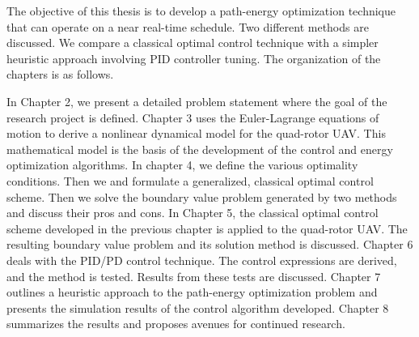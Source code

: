 The objective of this thesis is to develop a path-energy optimization technique that can operate on a near real-time schedule. Two different methods are discussed. We compare a classical optimal control technique with a simpler heuristic approach involving PID controller tuning. The organization of the chapters is as follows.

In Chapter 2, we present a detailed problem statement where the goal of the research project is defined. Chapter 3 uses the Euler-Lagrange equations of motion to derive a nonlinear dynamical model for the quad-rotor UAV. This mathematical model is the basis of the development of the control and energy optimization algorithms. In chapter 4, we define the various optimality conditions. Then we and formulate a generalized, classical optimal control scheme. Then we solve the boundary value problem generated by two methods and discuss their pros and cons. In Chapter 5, the classical optimal control scheme developed in the previous chapter is applied to the quad-rotor UAV. The resulting boundary value problem and its solution method is discussed. Chapter 6 deals with the PID/PD control technique. The control expressions are derived, and the method is tested. Results from these tests are discussed. Chapter 7 outlines a heuristic approach to the path-energy optimization problem and presents the simulation results of the control algorithm developed. Chapter 8 summarizes the results and proposes avenues for continued research.












